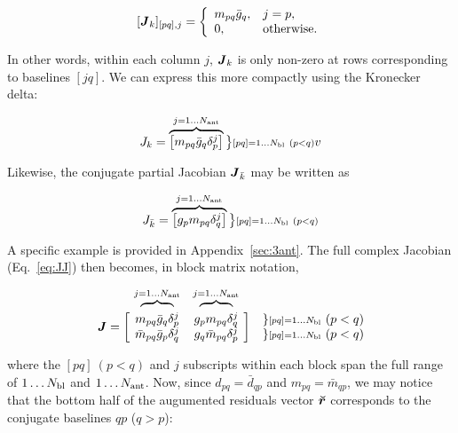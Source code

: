 \documentclass[useAMS,usenatbib]{mn2e}
\makeatletter
\newcommand{\mat}[1]{{\bmath{#1}}}
\newcommand{\JJ}{\mat{J}} %
\newcommand{\Matrix}[2]{\left [ \begin{array}{@{}#1@{}}#2\end{array} \right ]}
\newcommand{\Stack}[1]{\begin{array}{@{}c@{}}#1\end{array}}
\newcommand{\AUG}[1]{\bmath{\breve{#1}}}
\newcommand{\Rr}{\AUG{r}}
\makeatother
\begin{document}
\[
[ \JJ_k ]_{[pq],j} = \left \{  
  \begin{array}{ll} 
  m_{pq}\bar{g}_q,& j=p, \\
  0, & \mathrm{otherwise.}
  \end{array}
\right .
\]

In other words, within each column $j$, $\JJ_k$ is only non-zero at rows corresponding to baselines $[jq]$. We can express 
this more compactly using the Kronecker delta:


\begin{equation}
\label{eq:Jk}
J_k = \overbrace{ \Matrix{c}{ m_{pq}\bar{g}_q\delta^{j}_p } } ^{j=1\dots \Na} \big \}{\scriptstyle [pq]=1\dots \Nbl~(p<q)}
v\end{equation}

Likewise, the conjugate partial Jacobian $\JJ_{\bar{k}}$ may be written as

\begin{equation}
\label{eq:Jbark}
J_{\bar{k}} = \overbrace{ \Matrix{c}{ g_p m_{pq} \delta^{j}_q } } ^{j=1\dots \Na} \big \}{\scriptstyle [pq]=1\dots \Nbl~(p<q)}
\end{equation}

A specific example is provided in Appendix~\ref{sec:3ant}. The full complex Jacobian (Eq.~\ref{eq:JJ}) then 
becomes, in block matrix notation,

\begin{equation}
\label{eq:JJ:di:basic}
\begin{array}{r@{~}cc@{~}cc}
                & \overbrace{~~~~~~~~}^{j=1\dots \Na} & \overbrace{~~~~~~~~}^{j=1\dots \Na} \\
\JJ = \bigg [ &
  \Stack{ m_{pq}\bar{g}_q\delta^{j}_p \\ \bar{m}_{pq} \bar{g}_p \delta^{j}_q } &
  \Stack{ g_p m_{pq} \delta^{j}_q \\ g_q \bar{m}_{pq} \delta^{j}_p }  
& \bigg ] &
\Stack{ \} {\scriptstyle [pq]=1\dots \Nbl}~(p<q) \\ \} {\scriptstyle [pq]=1\dots \Nbl}~(p<q) }

\end{array}
\end{equation}

where the $[pq]~(p<q)$ and $j$ subscripts within each block span the full range of $1\dots N_\mathrm{bl}$ and $1\dots N_\mathrm{ant}$. Now, 
since $d_{pq} = \bar{d}_{qp}$ and $m_{pq} = \bar{m}_{qp}$, we may notice
that the bottom half of the augumented residuals vector $\Rr$ corresponds to the conjugate baselines 
$qp$ ($q>p$):
\end{document}
